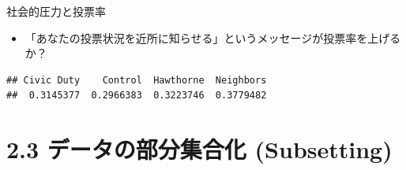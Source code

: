 \documentclass[
  ignorenonframetext,
]{beamer}
\newenvironment{Shaded}{\begin{snugshade}}{\end{snugshade}}
\newcommand{\CommentTok}[1]{\textcolor[rgb]{0.56,0.35,0.01}{\textit{#1}}}
\newcommand{\FunctionTok}[1]{\textcolor[rgb]{0.00,0.00,0.00}{#1}}
\newcommand{\NormalTok}[1]{#1}
\newcommand{\OtherTok}[1]{\textcolor[rgb]{0.56,0.35,0.01}{#1}}
\newcommand{\SpecialCharTok}[1]{\textcolor[rgb]{0.00,0.00,0.00}{#1}}
\newcommand{\StringTok}[1]{\textcolor[rgb]{0.31,0.60,0.02}{#1}}
\providecommand{\tightlist}{%
  \setlength{\itemsep}{0pt}\setlength{\parskip}{0pt}}
\begin{document}
\begin{frame}[fragile]{社会的圧力と投票率}
\protect\hypertarget{ux793eux4f1aux7684ux5727ux529bux3068ux6295ux7968ux7387}{}
\begin{itemize}
\tightlist
\item
  「あなたの投票状況を近所に知らせる」というメッセージが投票率を上げるか？
\end{itemize}

\begin{Shaded}
\end{Shaded}

\begin{verbatim}
## Civic Duty    Control  Hawthorne  Neighbors 
##  0.3145377  0.2966383  0.3223746  0.3779482
\end{verbatim}
\end{frame}

\hypertarget{ux30c7ux30fcux30bfux306eux90e8ux5206ux96c6ux5408ux5316-subsetting}{%
\section{2.3 データの部分集合化
(Subsetting)}\label{ux30c7ux30fcux30bfux306eux90e8ux5206ux96c6ux5408ux5316-subsetting}}
\end{document}
